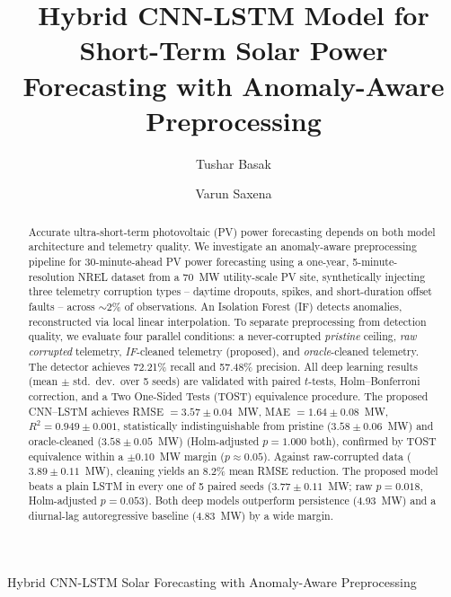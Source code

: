 \documentclass[runningheads]{llncs}
\begin{document}
\title{Hybrid CNN-LSTM Model for Short-Term Solar Power Forecasting with Anomaly-Aware Preprocessing}

\author{Tushar Basak \and Varun Saxena}


\maketitle
{}
{Hybrid CNN-LSTM Solar Forecasting with Anomaly-Aware Preprocessing}

\begin{abstract}
Accurate ultra-short-term photovoltaic (PV) power forecasting depends on both model architecture and telemetry quality. We investigate an anomaly-aware preprocessing pipeline for 30-minute-ahead PV power forecasting using a one-year, 5-minute-resolution NREL dataset from a 70~MW utility-scale PV site, synthetically injecting three telemetry corruption types -- daytime dropouts, spikes, and short-duration offset faults -- across $\sim$2\% of observations. An Isolation Forest (IF) detects anomalies, reconstructed via local linear interpolation. To separate preprocessing from detection quality, we evaluate four parallel conditions: a never-corrupted \emph{pristine} ceiling, \emph{raw corrupted} telemetry, \emph{IF}-cleaned telemetry (proposed), and \emph{oracle}-cleaned telemetry. The detector achieves 72.21\% recall and 57.48\% precision. All deep learning results (mean $\pm$ std.\ dev.\ over 5 seeds) are validated with paired $t$-tests, Holm--Bonferroni correction, and a Two One-Sided Tests (TOST) equivalence procedure. The proposed CNN--LSTM achieves RMSE $=3.57\pm0.04$~MW, MAE $=1.64\pm0.08$~MW, $R^2=0.949\pm0.001$, statistically indistinguishable from pristine ($3.58\pm0.06$~MW) and oracle-cleaned ($3.58\pm0.05$~MW) (Holm-adjusted $p=1.000$ both), confirmed by TOST equivalence within a $\pm0.10$~MW margin ($p\approx0.05$). Against raw-corrupted data ($3.89\pm0.11$~MW), cleaning yields an 8.2\% mean RMSE reduction. The proposed model beats a plain LSTM in every one of 5 paired seeds ($3.77\pm0.11$~MW; raw $p=0.018$, Holm-adjusted $p=0.053$). Both deep models outperform persistence (4.93~MW) and a diurnal-lag autoregressive baseline (4.83~MW) by a wide margin.

\end{abstract}
\end{document}

